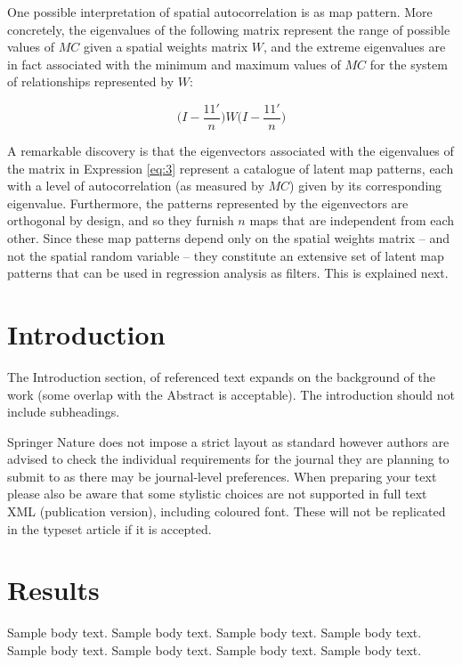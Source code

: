 \documentclass[sn-basic,lineno,pdflatex]{sn-jnl}
\theoremstyle{remark}
\theoremstyle{definition}
\begin{document}
One possible interpretation of spatial autocorrelation is as map
pattern. More concretely, the eigenvalues of the following matrix
represent the range of possible values of \(MC\) given a spatial weights
matrix \(W\), and the extreme eigenvalues are in fact associated with
the minimum and maximum values of \(MC\) for the system of relationships
represented by \(W\):

\begin{equation} 
\label{eq:3}
\Big(I - \frac{11'}{n}\Big)W\Big(I - \frac{11'}{n}\Big)
\end{equation}

A remarkable discovery is that the eigenvectors associated with the
eigenvalues of the matrix in Expression \ref{eq:3} represent a catalogue
of latent map patterns, each with a level of autocorrelation (as
measured by \(MC\)) given by its corresponding eigenvalue. Furthermore,
the patterns represented by the eigenvectors are orthogonal by design,
and so they furnish \(n\) maps that are independent from each other.
Since these map patterns depend only on the spatial weights matrix --
and not the spatial random variable -- they constitute an extensive set
of latent map patterns that can be used in regression analysis as
filters. This is explained next.

\section{Introduction}\label{sec1}

The Introduction section, of referenced text \citet{bib1} expands on the
background of the work (some overlap with the Abstract is acceptable).
The introduction should not include subheadings.

Springer Nature does not impose a strict layout as standard however
authors are advised to check the individual requirements for the journal
they are planning to submit to as there may be journal-level
preferences. When preparing your text please also be aware that some
stylistic choices are not supported in full text XML (publication
version), including coloured font. These will not be replicated in the
typeset article if it is accepted.

\section{Results}\label{sec2}

Sample body text. Sample body text. Sample body text. Sample body text.
Sample body text. Sample body text. Sample body text. Sample body text.
\end{document}
